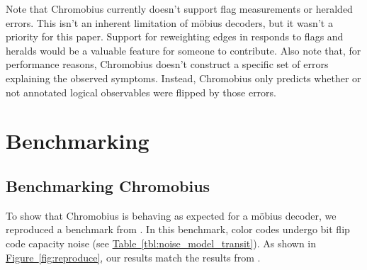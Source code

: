 \documentclass[onecolumn,unpublished,a4paper]{quantumarticle}
\theoremstyle{definition}
\theoremstyle{definition}
\theoremstyle{definition}
\newcommand{\fig}[1]{\hyperref[fig:#1]{Figure~\ref*{fig:#1}}}
\newcommand{\tbl}[1]{\hyperref[tbl:#1]{Table~\ref*{tbl:#1}}}
\begin{document}
Note that Chromobius currently doesn't support flag measurements or heralded errors.
This isn't an inherent limitation of m{\"o}bius decoders, but it wasn't a priority for this paper.
Support for reweighting edges in responds to flags and heralds would be a valuable feature for someone to contribute.
Also note that, for performance reasons, Chromobius doesn't construct a specific set of errors explaining the observed symptoms.
Instead, Chromobius only predicts whether or not annotated logical observables were flipped by those errors.


\section{Benchmarking}
\label{sec:benchmark}

\subsection{Benchmarking Chromobius}


To show that Chromobius is behaving as expected for a m{\"o}bius decoder, we reproduced a benchmark from \cite{sahay2022mobiusdecoder}.
In this benchmark, color codes undergo bit flip code capacity noise (see \tbl{noise_model_transit}).
As shown in \fig{reproduce}, our results match the results from \cite{sahay2022mobiusdecoder}.
\end{document}
